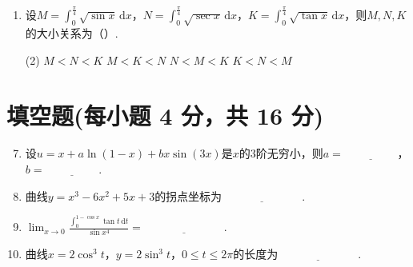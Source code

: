 \documentclass[../main.tex]{subfiles}
\begin{document}
\begin{enumerate}
          \begin{tasks}[label=\textbf{\Alph*.}, label-width=1.5em, column-sep=1em](2)
              \task $f(x)$单调减少，曲线$y=f(x)$下凸
              \task $f(x)$单调减少，曲线$y=f(x)$上凸
              \task $f(x)$单调增加，曲线$y=f(x)$下凸
              \task $f(x)$单调增加，曲线$y=f(x)$上凸
          \end{tasks}

    \item 设$M=\int_{0}^{\frac{\pi}{4}}\sqrt{\sin x}\,\mathrm{d}x$，$N=\int_{0}^{\frac{\pi}{4}}
              \sqrt{\sec x}\,\mathrm{d}x$，$K=\int_{0}^{\frac{\pi}{4}}\sqrt{\tan x}\,\mathrm{d}
              x$，则$M,N,K$的大小关系为（\qquad）.

          \begin{tasks}[label=\textbf{\Alph*.}, label-width=1.5em, column-sep=1em](2)
              \task $M<N<K$
              \task $M<K<N$
              \task $N<M<K$
              \task $K<N<M$
          \end{tasks}
\end{enumerate}

\section{填空题(每小题 4 分，共 16 分)}
\begin{enumerate}
    \setcounter{enumi}{6}
    \item 设$u=x+a\ln(1-x)+bx\sin(3x)$是$x$的$3$阶无穷小，则$a=\underline{\hspace{2cm}
              }$，$b=\underline{\hspace{2cm}}$.
          \vspace{0.5em}

    \item 曲线$y=x^{3}-6x^{2}+5x+3$的拐点坐标为$\underline{\hspace{3cm}}$.
          \vspace{0.5em}

    \item $\lim_{x\to0}\frac{\displaystyle\int_{0}^{1-\cos x}\tan t\,\mathrm{d}t}{\sin
                  x^{4}}=\underline{\hspace{3cm}}$.
          \vspace{0.5em}

    \item 曲线$x=2\cos^{3} t$，$y=2\sin^{3} t$，$0\leq t \leq 2\pi$的长度为$\underline
              {\hspace{3cm}}$.
\end{enumerate}
\end{document}
